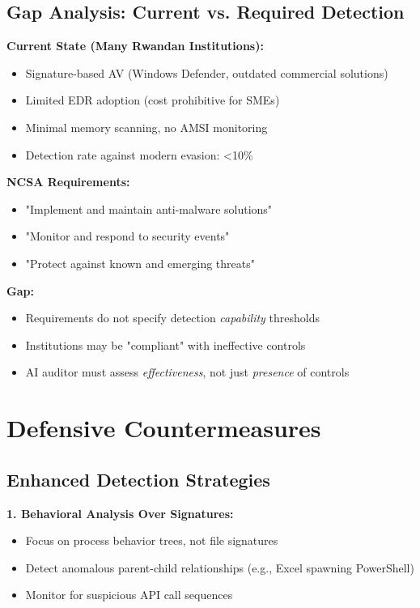 \documentclass[11pt,conference]{IEEEtran}
\begin{document}
\subsection{Gap Analysis: Current vs. Required Detection}

\textbf{Current State (Many Rwandan Institutions):}
\begin{itemize}
    \item Signature-based AV (Windows Defender, outdated commercial solutions)
    \item Limited EDR adoption (cost prohibitive for SMEs)
    \item Minimal memory scanning, no AMSI monitoring
    \item Detection rate against modern evasion: <10\%
\end{itemize}

\textbf{NCSA Requirements:}
\begin{itemize}
    \item "Implement and maintain anti-malware solutions"
    \item "Monitor and respond to security events"
    \item "Protect against known and emerging threats"
\end{itemize}

\textbf{Gap:}
\begin{itemize}
    \item Requirements do not specify detection \textit{capability} thresholds
    \item Institutions may be "compliant" with ineffective controls
    \item AI auditor must assess \textit{effectiveness}, not just \textit{presence} of controls
\end{itemize}

\section{Defensive Countermeasures}

\subsection{Enhanced Detection Strategies}

\textbf{1. Behavioral Analysis Over Signatures:}
\begin{itemize}
    \item Focus on process behavior trees, not file signatures
    \item Detect anomalous parent-child relationships (e.g., Excel spawning PowerShell)
    \item Monitor for suspicious API call sequences
\end{itemize}
\end{document}
